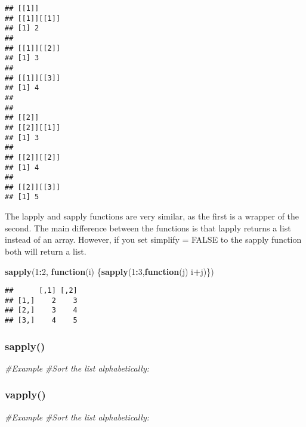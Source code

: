 \documentclass[
]{article}
\newenvironment{Shaded}{\begin{snugshade}}{\end{snugshade}}
\newcommand{\CommentTok}[1]{\textcolor[rgb]{0.56,0.35,0.01}{\textit{#1}}}
\newcommand{\ControlFlowTok}[1]{\textcolor[rgb]{0.13,0.29,0.53}{\textbf{#1}}}
\newcommand{\DecValTok}[1]{\textcolor[rgb]{0.00,0.00,0.81}{#1}}
\newcommand{\FunctionTok}[1]{\textcolor[rgb]{0.13,0.29,0.53}{\textbf{#1}}}
\newcommand{\NormalTok}[1]{#1}
\newcommand{\SpecialCharTok}[1]{\textcolor[rgb]{0.81,0.36,0.00}{\textbf{#1}}}
\begin{document}
\begin{verbatim}
## [[1]]
## [[1]][[1]]
## [1] 2
## 
## [[1]][[2]]
## [1] 3
## 
## [[1]][[3]]
## [1] 4
## 
## 
## [[2]]
## [[2]][[1]]
## [1] 3
## 
## [[2]][[2]]
## [1] 4
## 
## [[2]][[3]]
## [1] 5
\end{verbatim}

The lapply and sapply functions are very similar, as the first is a
wrapper of the second. The main difference between the functions is that
lapply returns a list instead of an array. However, if you set simplify
= FALSE to the sapply function both will return a list.

\begin{Shaded}
\begin{Highlighting}[]
\FunctionTok{sapply}\NormalTok{(}\DecValTok{1}\SpecialCharTok{:}\DecValTok{2}\NormalTok{, }\ControlFlowTok{function}\NormalTok{(i) \{}\FunctionTok{sapply}\NormalTok{(}\DecValTok{1}\SpecialCharTok{:}\DecValTok{3}\NormalTok{,}\ControlFlowTok{function}\NormalTok{(j) i}\SpecialCharTok{+}\NormalTok{j)\})}
\end{Highlighting}
\end{Shaded}

\begin{verbatim}
##      [,1] [,2]
## [1,]    2    3
## [2,]    3    4
## [3,]    4    5
\end{verbatim}

\hypertarget{sapply}{%
\subsubsection{sapply()}\label{sapply}}

\begin{Shaded}
\begin{Highlighting}[]
\CommentTok{\#Example}
\CommentTok{\#Sort the list alphabetically:}
\end{Highlighting}
\end{Shaded}

\hypertarget{vapply}{%
\subsubsection{vapply()}\label{vapply}}

\begin{Shaded}
\begin{Highlighting}[]
\CommentTok{\#Example}
\CommentTok{\#Sort the list alphabetically:}
\end{Highlighting}
\end{Shaded}
\end{document}
